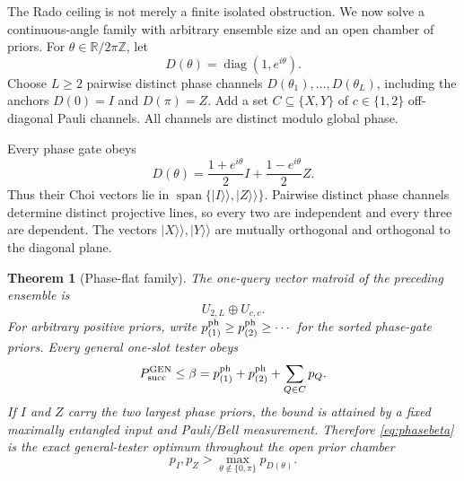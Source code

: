 \documentclass[11pt]{article}
\newtheorem{theorem}{Theorem}[section]
\theoremstyle{definition}
\theoremstyle{remark}
\newcommand{\Span}{\operatorname{span}}
\newcommand{\vket}[1]{\lvert #1\rangle\!\rangle}
\begin{document}
The Rado ceiling is not merely a finite isolated obstruction.  We now solve a
continuous-angle family with arbitrary ensemble size and an open chamber of
priors.  For \(\theta\in\mathbb R/2\pi\mathbb Z\), let
\begin{equation}
                     D(\theta)=\operatorname{diag}(1,e^{i\theta}).
                                                               \label{eq:phasegate}
\end{equation}
Choose \(L\geq2\) pairwise distinct phase channels
\(D(\theta_1),\ldots,D(\theta_L)\), including the anchors
\(D(0)=I\) and \(D(\pi)=Z\).  Add a set \(C\subseteq\{X,Y\}\) of
\(c\in\{1,2\}\) off-diagonal Pauli channels.  All channels are distinct
modulo global phase.

Every phase gate obeys
\begin{equation}
 D(\theta)=\frac{1+e^{i\theta}}2I
           +\frac{1-e^{i\theta}}2Z.                    \label{eq:phaseflat}
\end{equation}
Thus their Choi vectors lie in \(\Span\{\vket I,\vket Z\}\).  Pairwise
distinct phase channels determine distinct projective lines, so every two are
independent and every three are dependent.  The vectors \(\vket X,\vket Y\)
are mutually orthogonal and orthogonal to the diagonal plane.

\begin{theorem}[Phase-flat family]\label{thm:phasefamily}
The one-query vector matroid of the preceding ensemble is
\begin{equation}
                         U_{2,L}\oplus U_{c,c}.          \label{eq:phasematroid}
\end{equation}
For arbitrary positive priors, write
\(p^{\rm ph}_{(1)}\geq p^{\rm ph}_{(2)}\geq\cdots\) for the sorted phase-gate
priors.  Every general one-slot tester obeys
\begin{equation}
 P_{\rm succ}^{\rm GEN}
 \leq \beta
 =p^{\rm ph}_{(1)}+p^{\rm ph}_{(2)}+\sum_{Q\in C}p_Q.   \label{eq:phasebeta}
\end{equation}
If \(I\) and \(Z\) carry the two largest phase priors, the bound is attained
by a fixed maximally entangled input and Pauli/Bell measurement.  Therefore
\cref{eq:phasebeta} is the exact general-tester optimum throughout the open
prior chamber
\begin{equation}
 p_I,p_Z>\max_{\theta\notin\{0,\pi\}}p_{D(\theta)}.      \label{eq:phasechamber}
\end{equation}
\end{theorem}
\end{document}
